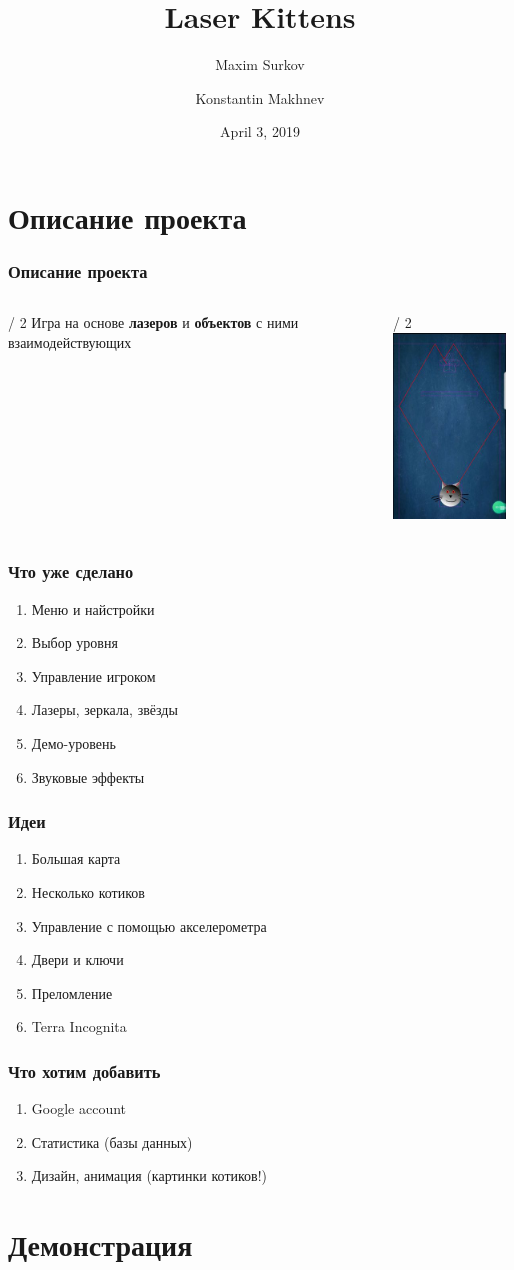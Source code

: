 \documentclass[12pt]{beamer}
\title[kittens] {Laser Kittens}
\author[Maxim Surkov, Konstantin Makhnev]
{Maxim Surkov \and Konstantin Makhnev}
\institute[Abstract University]
{
  Higher School of Economics
}
\date[date]
{April 3, 2019}
\begin{document}
\frame{\titlepage}

\section[Section] {Описание проекта}

\begin{frame}
    \frametitle{Описание проекта}
    \begin{columns}[T]
     \begin{column}[T]{\textwidth / 2}
        Игра на основе {\bf лазеров} и {\bf объектов} с ними взаимодействующих
     \end{column}
     \begin{column}[T]{\textwidth / 2}
         \includegraphics[width = 3cm]{cutmypic.png}
     \end{column}
     \end{columns}
\end{frame}

\begin{frame}
    \frametitle{Что уже сделано}
    \begin{enumerate}
        \item Меню и найстройки
        \item Выбор уровня
        \item Управление игроком
        \item Лазеры, зеркала, звёзды
        \item Демо-уровень
        \item Звуковые эффекты
    \end{enumerate}
\end{frame}

\begin{frame}
    \frametitle{Идеи}
    \begin{enumerate}
        \item Большая карта
        \item Несколько котиков
        \item Управление с помощью акселерометра
        \item Двери и ключи
        \item Преломление
        \item Terra Incognita
    \end{enumerate}
\end{frame}

\begin{frame}
    \frametitle{Что хотим добавить}
    \begin{enumerate}
        \item Google account
        \item Статистика (базы данных)
        \item Дизайн, анимация (картинки котиков!)
    \end{enumerate}
\end{frame}

\section[Section] {Демонстрация}
\end{document}
